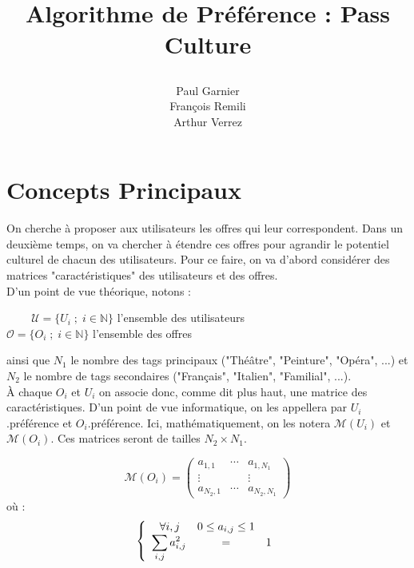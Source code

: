 \documentclass[11pt, oneside]{article}
\title{\begin{center} Algorithme de Préférence : Pass Culture \end{center}}
\author{Paul Garnier \\ François Remili \\ Arthur Verrez}
\begin{document}
\maketitle


\pagestyle{empty}

\maketitle





\pagestyle{plain}

\section{Concepts Principaux}

On cherche à proposer aux utilisateurs les offres qui leur correspondent. Dans un deuxième temps, on va chercher à étendre ces offres pour agrandir le potentiel culturel de chacun des utilisateurs. Pour ce faire, on va d'abord considérer des matrices "caractéristiques" des utilisateurs et des offres. \\

D'un point de vue théorique, notons :

\begin{center}

 $\;\;\;\;\;\;\;\;\mathcal{U} = \{U_i \; ; \; i \in \mathbb{N} \}$ l'ensemble des utilisateurs \\
$\mathcal{O} = \{O_i \; ; \; i \in \mathbb{N} \}$ l'ensemble des offres \\

\end{center}

ainsi que $N_1$ le nombre des tags principaux ("Théâtre", "Peinture", "Opéra", ...) et $N_2$ le nombre de tags secondaires ("Français", "Italien", "Familial", ...). \\

À chaque $O_i$ et $U_i$ on associe donc, comme dit plus haut, une matrice des caractéristiques. D'un point de vue informatique, on les appellera par $U_i$.préférence et $O_i$.préférence. Ici, mathématiquement, on les notera $\mathcal{M} (U_i)$ et $\mathcal{M} (O_i)$. Ces matrices seront de tailles $N_2 \times N_1$.

\begin{center}
\[
\mathcal{M} (O_i) =
\begin{pmatrix}
a_{1,1} & \cdots & a_{1,N_1} \\
\vdots & & \vdots \\
a_{N_2,1} & \cdots & a_{N_2,N_1}
\end{pmatrix}
\]
où :
\[
 \left \{
   \begin{array}{r c l}
      \forall i,j \; \; & 0 \leq a_{i,j} \leq 1 \\
      \displaystyle \sum_{i,j} a_{i,j}^{2} &=& 1 \\
   \end{array}
   \right .
\]
\end{center}
\end{document}
